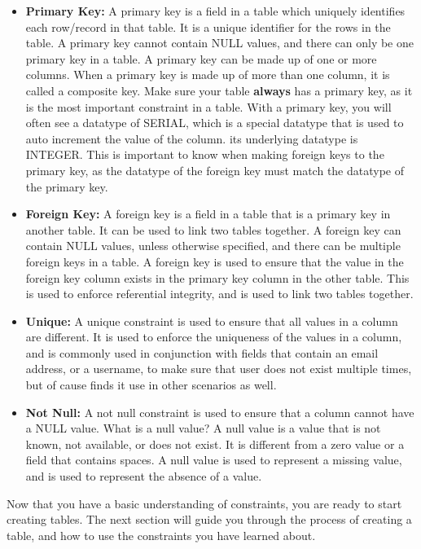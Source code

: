 \begin{itemize}
    \item \textbf{Primary Key:} A primary key is a field in a table which uniquely identifies each row/record in that table. It is a unique identifier for the rows in the table. A primary key cannot contain NULL values, and there can only be one primary key in a table. A primary key can be made up of one or more columns. When a primary key is made up of more than one column, it is called a composite key. Make sure your table \textbf{always} has a primary key, as it is the most important constraint in a table. With a primary key, you will often see a datatype of SERIAL, which is a special datatype that is used to auto increment the value of the column. its underlying datatype is INTEGER. This is important to know when making foreign keys to the primary key, as the datatype of the foreign key must match the datatype of the primary key.
    \item \textbf{Foreign Key:} A foreign key is a field in a table that is a primary key in another table. It can be used to link two tables together. A foreign key can contain NULL values, unless otherwise specified, and there can be multiple foreign keys in a table. A foreign key is used to ensure that the value in the foreign key column exists in the primary key column in the other table. This is used to enforce referential integrity, and is used to link two tables together.
    \item \textbf{Unique:} A unique constraint is used to ensure that all values in a column are different. It is used to enforce the uniqueness of the values in a column, and is commonly used in conjunction with fields that contain an email address, or a username, to make sure that user does not exist multiple times, but of cause finds it use in other scenarios as well.
    \item \textbf{Not Null:} A not null constraint is used to ensure that a column cannot have a NULL value. What is a null value? A null value is a value that is not known, not available, or does not exist. It is different from a zero value or a field that contains spaces. A null value is used to represent a missing value, and is used to represent the absence of a value.
\end{itemize}

Now that you have a basic understanding of constraints, you are ready to start creating tables. The next section will guide you through the process of creating a table, and how to use the constraints you have learned about.

